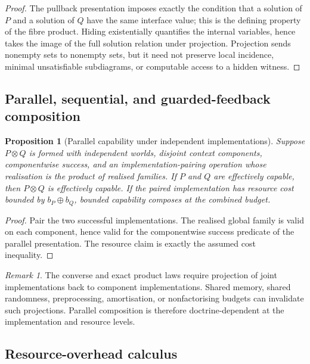 \documentclass[11pt]{article}
\theoremstyle{plain}
\newtheorem{proposition}[theorem]{Proposition}
\theoremstyle{definition}
\theoremstyle{remark}
\newtheorem{remark}[theorem]{Remark}
\begin{document}
\begin{proof}
The pullback presentation imposes exactly the condition that a solution of $P$
and a solution of $Q$ have the same interface value; this is the defining
property of the fibre product. Hiding existentially quantifies the internal
variables, hence takes the image of the full solution relation under projection.
Projection sends nonempty sets to nonempty sets, but it need not preserve local
incidence, minimal unsatisfiable subdiagrams, or computable access to a hidden
witness.
\end{proof}

\subsection{Parallel, sequential, and guarded-feedback composition}

\begin{proposition}[Parallel capability under independent implementations]
\label{prop:parallel-capability-monograph}
Suppose $P\otimes Q$ is formed with independent worlds, disjoint context
components, componentwise success, and an implementation-pairing operation whose
realisation is the product of realised families. If $P$ and $Q$ are effectively
capable, then $P\otimes Q$ is effectively capable. If the paired implementation
has resource cost bounded by $b_P\oplus b_Q$, bounded capability composes at the
combined budget.
\end{proposition}

\begin{proof}
Pair the two successful implementations. The realised global family is valid on
each component, hence valid for the componentwise success predicate of the
parallel presentation. The resource claim is exactly the assumed cost inequality.
\end{proof}

\begin{remark}
The converse and exact product laws require projection of joint implementations
back to component implementations. Shared memory, shared randomness, preprocessing,
amortisation, or nonfactorising budgets can invalidate such projections. Parallel
composition is therefore doctrine-dependent at the implementation and resource
levels.
\end{remark}

\subsection{Resource-overhead calculus}
\label{subsec:resource-overhead-calculus}
\end{document}
